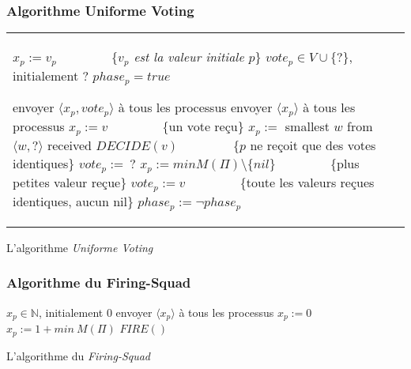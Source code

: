 \documentclass{beamer}
\begin{document}
\begin{frame}
\frametitle{Algorithme Uniforme Voting}
\begin{algorithm}[H]
\tiny{
\begin{distribalgo}[1]
\begin{tabular}{ll}
\begin{minipage}{33em}
\INDENT{\textbf{Initialisation:}}
  \STATE $x_p := v_p$ ~~~~~~~~\{\emph{\tiny $v_p$ est la valeur initiale $p$}\}
  \STATE $vote_p \in V\cup\{ ? \}$, initialement $?$
  \STATE $phase_p = true$

\ENDINDENT
\INDENT{\textbf{Round $r$:}}
	\INDENT{$S_p^r:$}
		\IF{$phase_p$}
			\STATE envoyer $\langle x_p , vote_p \rangle$ à tous les processus
		\ELSE
			\STATE envoyer $\langle x_p \rangle$ à tous les processus
			\ENDIF
	\ENDINDENT
	\INDENT{$T_p^r:$}
		\IF{$phase_p$}
			\IF{$M(q) = \langle v, v \rangle$}
				\STATE $x_p:= v$ ~~~~~~~~\{\tiny un vote reçu\}
			\ELSE
				\STATE $x_p :=$ smallest  $w$ from  $\langle w , ? \rangle$ received
			\ENDIF
			\IF{$M(\Pi) = \{ \langle v, v \rangle \}$}
				\STATE $DECIDE(v)$ ~~~~~~~~\{\tiny $p$ ne reçoit que des votes identiques\}
			\ENDIF
			\STATE $vote_p :=\ ?$
		\ELSE
			\STATE $ x_p := min M(\Pi) \setminus \{nil\}$ ~~~~~~~~\{\tiny plus petites valeur reçue\}
			\IF{$M(\Pi) = \{v\}$}
				\STATE $vote_p := v$ ~~~~~~~~\{\tiny toute les valeurs reçues identiques, aucun nil\}
			\ENDIF
		\ENDIF
		\STATE $phase_p := \neg phase_p$
	\ENDINDENT
\ENDINDENT
\end{minipage}
\end{tabular}
\caption{L'algorithme {\em Uniforme Voting}}
\label{unifvotfig}
\end{distribalgo}
}
\end{algorithm}
\end{frame}

\begin{frame}
\frametitle{Algorithme du Firing-Squad}
\begin{algorithm}[H]
\scriptsize{
\begin{distribalgo}[1]
	\STATE $x_p \in \mathds{N}$, initialement 0
\ENDINDENT
{}
	\INDENT{$S_p:$}
		\STATE envoyer $\langle x_p \rangle$ à tous les processus
	\ENDINDENT
	\BLANK
	\INDENT{$T_p(M):$}
		\IF{$nil \in M(\Pi)$}
			\STATE $x_p := 0$
		\ELSE
			\STATE $x_p := 1 + min~M(\Pi)$
		\ENDIF
		\IF{$x_p > D$}
			\STATE $FIRE()$
		\ENDIF
	\ENDINDENT
\ENDINDENT 
\caption{L'algorithme du {\em Firing-Squad}} \label{algo:R}
\BLANK
\end{distribalgo}
}
\end{algorithm}
\end{frame}
\end{document}
